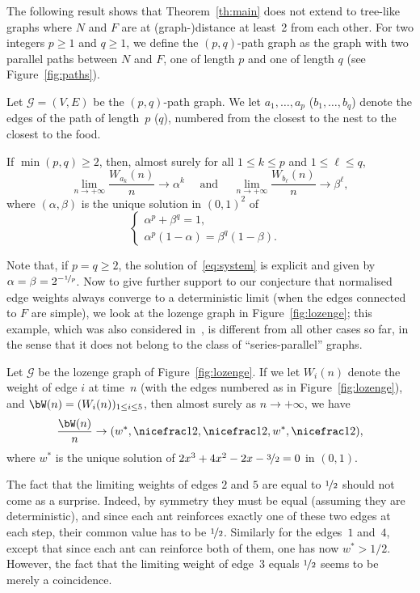 The following result shows that Theorem~\ref{th:main} does not extend to tree-like graphs where $N$ and $F$ are at (graph-)distance at least~2 from each other. For two integers $p\geq 1$ and $q\geq 1$, we define the $(p,q)$-path graph as the graph
with two parallel paths between $N$ and $F$,
one of length $p$ and one of length $q$ (see Figure~\ref{fig:paths}).

\begin{theorem}\label{th:two_paths}
Let $\mathcal G = (V,E)$ be the $(p,q)$-path graph.
We let $a_1, \ldots, a_p$ (\resp $b_1, \ldots, b_q$) denote the edges of the path of length~$p$ (\resp $q$), numbered from the closest to the nest to the closest to the food.

If $\min(p,q)\geq 2$, then, almost surely for all $1\leq k\leq p$ and $1\leq\ell\leq q$,
\[
\lim_{n\to+\infty} \frac{W_{a_k}(n)}n \to \alpha^k
\quad \text{ and }\quad
\lim_{n\to+\infty} \frac{W_{b_\ell}(n)}n \to \beta^\ell,
\]
where $(\alpha, \beta)$ is the unique solution in $(0,1)^2$ of
\begin{equation}\label{eq:system}
\begin{cases}
\alpha^p+\beta^q = 1,&\\
\alpha^p(1-\alpha) =\beta^q(1-\beta).
\end{cases}
\end{equation}
\end{theorem}

Note that, if $p=q\geq 2$, the solution of~\eqref{eq:system}
is explicit and given by $\alpha = \beta = 2^{-\nicefrac1p}$. Now to give further support to our conjecture that normalised edge weights always converge to a deterministic limit (when the edges connected to $F$ are simple), we look at the lozenge graph in Figure~\ref{fig:lozenge}; this example, which was also considered in~\cite{KMS},
is different from all other cases so far, in the sense that it does not belong to the class of ``series-parallel'' graphs.
\begin{proposition}\label{prop:lozenge}
Let $\mathcal G$ be the lozenge graph of Figure~\ref{fig:lozenge}. If we let $W_i(n)$ denote the weight of edge $i$ at time~$n$ (with the edges numbered as in Figure~\ref{fig:lozenge}), and $\bW(n) = (W_i(n))_{1\leq i\leq 5}$, then almost surely as $n\to+\infty$, we have
\[
\frac{\bW(n)}{n} \to (w^*, \nicefrac12, \nicefrac12, w^*, \nicefrac12),
\]
where $w^*$ is the unique solution of $2x^3+4x^2-2x-\nicefrac32 = 0$ in $(0,1)$.
\end{proposition}
{The fact that the limiting weights of edges $2$ and $5$ are equal to $\nicefrac12$ should not come as a surprise. Indeed, by symmetry they must be equal (assuming they are deterministic),
and since each ant reinforces exactly one of these two edges at each step, their common value has to be $\nicefrac12$.
Similarly for the edges~$1$ and~$4$, except that since each ant can reinforce both of them,
one has now $w^*>1/2$.
However, the fact that the limiting weight of edge~$3$ equals $\nicefrac12$ seems to be merely a coincidence.}

